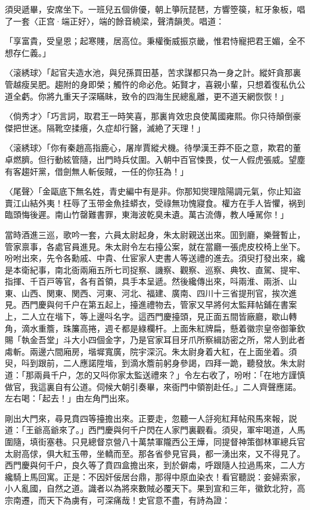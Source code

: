 須臾遞畢，安席坐下。一班兒五個俳優，朝上箏阮琵琶，方響箜篌，紅牙象板，唱了一套〈正宫·端正好〉，端的餘音繞梁，聲清韻羙。唱道：

「享富貴，受皇恩；起寒賤，居高位。秉權衡威振京畿，惟君恃寵把君王媚，全不想存仁義。」

〈滚綉球〉「起官夫造水池，與兒孫買田基，苦求謀都只為一身之計。縱奸貪那裏管越瘦吴肥。趨附的身即榮；觸忤的命必危。妬賢才，喜親小輩，只想着復私仇公道全虧。你將九重天子深瞞眛，致令的四海生民總亂離，更不道天網恢恢！」

〈倘秀才〉「巧言詞，取君王一時笑喜，那裏肯效忠良使萬國雍熙。你只待顛倒豪傑把世迷。隔靴空揉癢，久症却行醫，滅絶了天理！」

〈滚綉球〉「你有秦趙高指鹿心，屠岸賈縱犬機。待學漢王莽不臣之意，欺君的董卓燃臍。但行動絃管隨，出門時兵仗圍。入朝中百官悚畏，仗一人假虎張威。望塵有客趨奸黨，借劍無人斬佞賊，一任的你狂為！」

〈尾聲〉「金甌底下無名姓，青史編中有是非。你那知爕理陰陽調元氣，你止知盜賣江山結外夷！枉辱了玉带金魚挂蟒衣，受祿無功愧寢食。權方在手人皆懼，祸到臨頭悔後遲。南山竹罄難書罪，東海波乾臭未遺。萬古流傳，教人唾駡你！」

當時酒進三巡，歌吟一套，六員太尉起身，朱太尉親送出來。囬到廳，樂聲暫止，管家禀事，各處官員進見。朱太尉令左右擡公案，就在當廳一張虎皮校椅上坐下。吩咐出來，先令各勳戚、中貴、仕宦家人吏書人等送禮的進去。須臾打發出來，纔是本衛紀事，南北衙兩廂五所七司捉察、譏察、觀察、巡察、典牧、直駕、提牢、指揮、千百戸等官，各有首領，具手本呈遞。然後纔傳出來，呌兩淮、兩浙、山東、山西、関東、関西、河東、河北、福建、廣南、四川十三省提刑官，挨次進見。西門慶與何千户在第五起上，擡進禮物去，管家又早將何太監拜帖鋪在書案上，二人立在堦下，等上邊呌名字。這西門慶擡頭，見正面五間皆廠廳，歇山轉角，滴水重簷，珠簾高捲，週そ都是綠欄杆。上面朱紅牌扁，懸着徽宗皇帝御筆欽賜「執金吾堂」斗大小四個金字，乃是官家耳目牙爪所察緝訪密之所，常人到此者䖏斬。兩邊六間廂房，堦墀寬廣，院宇深沉。朱太尉身着大紅，在上面坐着。須臾，呌到跟前，二人應諾陞堦，到滴水簷前躬身參謁，四拜一跪，聽發放。朱太尉道：「那兩員千户，怎的又呌你家太監送禮來？」令左右收了，吩咐：「在地方謹慎做官，我這裏自有公道。伺候大朝引奏畢，來衙門中領劄赴任。」二人齊聲應諾。左右喝：「起去！」由左角門出來。

剛出大門來，尋見賁四等擡擔出來。正要走，忽聽一人㧱宛紅拜帖飛馬來報，説道：「王爺高爺來了。」西門慶與何千户閃在人家門裏觀看。須臾，軍牢喝道，人馬圍隨，填街塞巷。只見總督京營八十萬禁軍隴西公王燁，同提督神策御林軍總兵官太尉高俅，俱大紅玉帶，坐轎而至。那各省參見官員，都一湧出來，又不得見了。西門慶與何千户，良久等了賁四盒擔出來，到於僻䖏，呼跟隨人拉過馬來，二人方纔騎上馬回寓。正是：不因奸佞居台鼎，那得中原血染衣！看官聽説：妾婦索家，小人亂國，自然之道。識者以為將來數賊必覆天下。果到宣和三年，徽欽北狩，高宗南遷，而天下為虜有，可深痛哉！史官意不盡，有詩為證：

